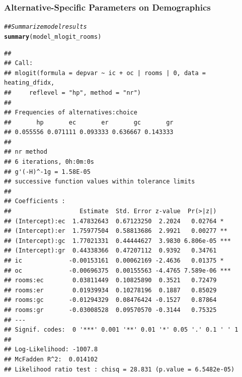 \documentclass{beamer}\usepackage[]{graphicx}\usepackage[]{color}
\makeatletter
\newcommand{\hlcom}[1]{\textcolor[rgb]{0.678,0.584,0.686}{\textit{#1}}}%
\newcommand{\hlstd}[1]{\textcolor[rgb]{0.345,0.345,0.345}{#1}}%
\newcommand{\hlkwd}[1]{\textcolor[rgb]{0.737,0.353,0.396}{\textbf{#1}}}%
\newenvironment{kframe}{%
 \def\at@end@of@kframe{}%
 \ifinner\ifhmode%
  \def\at@end@of@kframe{\end{minipage}}%
  \begin{minipage}{\columnwidth}%
 \fi\fi%
 \def\FrameCommand##1{\hskip\@totalleftmargin \hskip-\fboxsep
 \colorbox{shadecolor}{##1}\hskip-\fboxsep
     \hskip-\linewidth \hskip-\@totalleftmargin \hskip\columnwidth}%
 \MakeFramed {\advance\hsize-\width
   \@totalleftmargin\z@ \linewidth\hsize
   \@setminipage}}%
 {\par\unskip\endMakeFramed%
 \at@end@of@kframe}
\newenvironment{knitrout}{}{} %
\makeatother
\begin{document}
\begin{frame}[fragile]\frametitle{Alternative-Specific Parameters on Demographics}
    \vspace{1ex}
\begin{knitrout}\tiny
{}\color{fgcolor}\begin{kframe}
\begin{alltt}
\hlcom{## Summarize model results}
\hlkwd{summary}\hlstd{(model_mlogit_rooms)}
\end{alltt}
\begin{verbatim}
## 
## Call:
## mlogit(formula = depvar ~ ic + oc | rooms | 0, data = heating_dfidx, 
##     reflevel = "hp", method = "nr")
## 
## Frequencies of alternatives:choice
##       hp       ec       er       gc       gr 
## 0.055556 0.071111 0.093333 0.636667 0.143333 
## 
## nr method
## 6 iterations, 0h:0m:0s 
## g'(-H)^-1g = 1.58E-05 
## successive function values within tolerance limits 
## 
## Coefficients :
##                   Estimate  Std. Error z-value  Pr(>|z|)    
## (Intercept):ec  1.47832643  0.67123250  2.2024   0.02764 *  
## (Intercept):er  1.75977504  0.58813686  2.9921   0.00277 ** 
## (Intercept):gc  1.77021331  0.44444627  3.9830 6.806e-05 ***
## (Intercept):gr  0.44338366  0.47207112  0.9392   0.34761    
## ic             -0.00153161  0.00062169 -2.4636   0.01375 *  
## oc             -0.00696375  0.00155563 -4.4765 7.589e-06 ***
## rooms:ec        0.03811449  0.10825890  0.3521   0.72479    
## rooms:er        0.01939934  0.10278196  0.1887   0.85029    
## rooms:gc       -0.01294329  0.08476424 -0.1527   0.87864    
## rooms:gr       -0.03008528  0.09570570 -0.3144   0.75325    
## ---
## Signif. codes:  0 '***' 0.001 '**' 0.01 '*' 0.05 '.' 0.1 ' ' 1
## 
## Log-Likelihood: -1007.8
## McFadden R^2:  0.014102 
## Likelihood ratio test : chisq = 28.831 (p.value = 6.5482e-05)
\end{verbatim}
\end{kframe}
\end{knitrout}
\end{frame}
\end{document}
